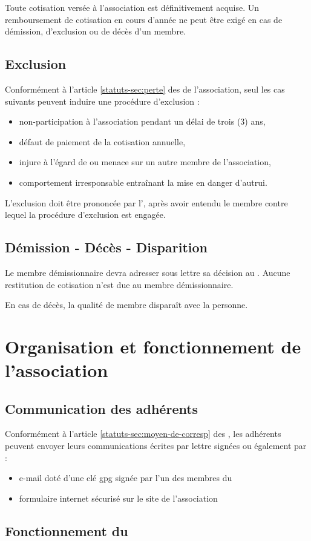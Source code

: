 \documentclass[a4paper,french,10pt]{article}
\newcommand{\article}[1]{\subsection{#1}\addtocounter{article}{1}}
\newcounter{article}
\newcommand{\artrefst}[1]{article \ref{statuts-#1} des \statuts{}}
\begin{document}
Toute cotisation versée à l'association est définitivement acquise. Un remboursement de cotisation en cours d'année ne peut être exigé en cas de démission, d'exclusion ou de décès d'un membre.

\article{Exclusion}
\label{sec:exclusion}

Conformément à l'\artrefst{sec:perte} de l'association, seul les cas suivants  peuvent induire une procédure d'exclusion :
\begin{itemize}
\item non-participation à l'association pendant un délai de trois (3) ans,
\item défaut de paiement de la cotisation annuelle,
\item injure à l'égard de ou menace sur un autre membre de l'association,
\item comportement irresponsable entraînant la mise en danger d'autrui.
\end{itemize}

L'exclusion doit être prononcée par l'\AG{}, après avoir entendu le membre contre lequel la procédure d'exclusion est engagée.

\article{Démission - Décès - Disparition}
\label{sec:demiss-deces-disp}
Le membre démissionnaire devra adresser sous lettre sa décision au \bureau{}.
Aucune restitution de cotisation n'est due au membre démissionnaire.

En cas de décès, la qualité de membre disparaît avec la personne.

\section{Organisation et fonctionnement de l'association}

\article{Communication des adhérents}
\label{sec:comm-des-adher}

Conformément à l'\artrefst{sec:moyen-de-corresp}, les adhérents peuvent envoyer leurs communications écrites par lettre signées ou également par :
\begin{itemize}
\item e-mail doté d'une clé gpg signée par l'un des membres du \bureau{}
\item formulaire internet sécurisé sur le site de l'association
\end{itemize}


\article{Fonctionnement du \bureau{}}
\label{sec:fonct-du-bure}
\end{document}
